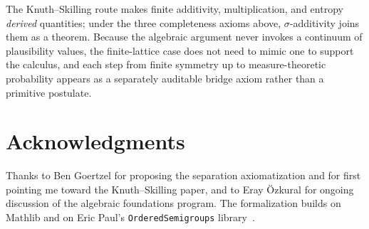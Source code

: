 \documentclass[11pt]{article}
\theoremstyle{definition}
\theoremstyle{remark}
\begin{document}
The Knuth--Skilling route makes finite additivity, multiplication, and entropy
\emph{derived} quantities; under the three completeness axioms above, $\sigma$-additivity
joins them as a theorem. Because the algebraic argument never invokes a continuum of
plausibility values, the finite-lattice case does not need to mimic one to support the
calculus, and each step from finite symmetry up to measure-theoretic probability appears
as a separately auditable bridge axiom rather than a primitive postulate.

\section*{Acknowledgments}
Thanks to Ben Goertzel for proposing the separation axiomatization and for first pointing
me toward the Knuth--Skilling paper, and to Eray \"Ozkural for ongoing discussion of the
algebraic foundations program. The formalization builds on Mathlib and on Eric Paul's
\texttt{OrderedSemigroups} library~\cite{Paul2024}.
\end{document}
